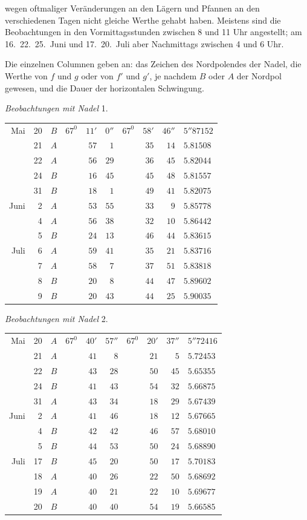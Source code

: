 wegen oftmaliger Veränderungen an den Lägern und Pfannen an den verschiedenen Tagen nicht gleiche Werthe gehabt haben. Meistens sind die Beobachtungen in den Vormittagsstunden zwischen 8 und 11 Uhr angestellt; am 16.\ 22.\ 25.\ Juni und 17.\ 20.\ Juli aber Nachmittags zwischen 4 und 6 Uhr.

Die einzelnen Columnen geben an: das Zeichen des Nordpolendes der Nadel, die Werthe von $f$ und $g$ oder von $f'$ und $g'$, je nachdem $B$ oder $A$ der Nordpol gewesen, und die Dauer der horizontalen Schwingung.

\begin{center}
\textit{Beobachtungen mit Nadel} 1.

\begin{tabular}{rr|c|rrr|rrr|l}
Mai&20&$B$&$67^0$&$11'$&$0''$&$67^0$&$58'$&$46''$&$5''87152$\\
&21&$A$&&$57$&$1$&&$35$&$14$&$5.81508$\\
&22&$A$&&$56$&$29$&&$36$&$45$&$5.82044$\\
&24&$B$&&$16$&$45$&&$45$&$48$&$5.81557$\\
&31&$B$&&$18$&$1$&&$49$&$41$&$5.82075$\\
Juni&2&$A$&&$53$&$55$&&$33$&$9$&$5.85778$\\
&4&$A$&&$56$&$38$&&$32$&$10$&$5.86442$\\
&5&$B$&&$24$&$13$&&$46$&$44$&$5.83615$\\
Juli&6&$A$&&$59$&$41$&&$35$&$21$&$5.83716$\\
&7&$A$&&$58$&$7$&&$37$&$51$&$5.83818$\\
&8&$B$&&$20$&$8$&&$44$&$47$&$5.89602$\\
&9&$B$&&$20$&$43$&&$44$&$25$&$5.90035$
\end{tabular}
\end{center}

\begin{center}
\textit{Beobachtungen mit Nadel} 2.

\begin{tabular}{rr|c|rrr|rrr|l}
Mai&20&$A$&$67^0$&$40'$&$57''$&$67^0$&$20'$&$37''$&$5''72416$\\
&21&$A$&&$41$&$8$&&$21$&$5$&$5.72453$\\
&22&$B$&&$43$&$28$&&$50$&$45$&$5.65355$\\
&24&$B$&&$41$&$43$&&$54$&$32$&$5.66875$\\
&31&$A$&&$43$&$34$&&$18$&$29$&$5.67439$\\
Juni&2&$A$&&$41$&$46$&&$18$&$12$&$5.67665$\\
&4&$B$&&$42$&$42$&&$46$&$57$&$5.68010$\\
&5&$B$&&$44$&$53$&&$50$&$24$&$5.68890$\\
Juli&17&$B$&&$45$&$20$&&$50$&$17$&$5.70183$\\
&18&$A$&&$40$&$26$&&$22$&$50$&$5.68692$\\
&19&$A$&&$40$&$21$&&$22$&$10$&$5.69677$\\
&20&$B$&&$40$&$40$&&$54$&$19$&$5.66585$
\end{tabular}
\end{center}

